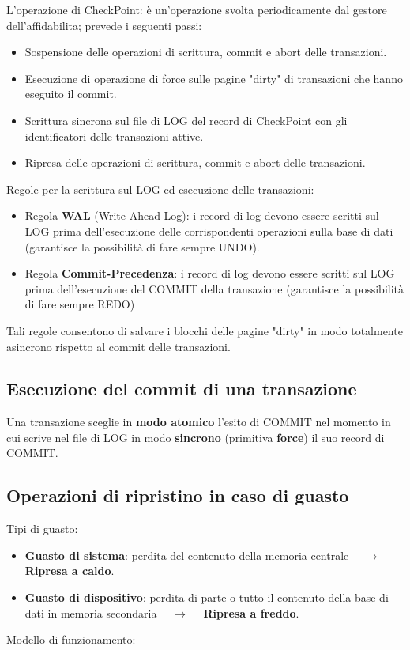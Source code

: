 \documentclass[a4paper, 10pt]{article}
\theoremstyle{definition}
\begin{document}
	L'operazione di CheckPoint: è un'operazione svolta
	periodicamente dal gestore dell'affidabilita; prevede i
	seguenti passi:
	\begin{itemize}
		\item Sospensione delle operazioni di scrittura, commit e abort delle
		transazioni.
		\item Esecuzione di operazione di force sulle pagine "dirty" di
		transazioni che hanno eseguito il commit.
		\item Scrittura sincrona sul file di LOG del record di CheckPoint con
		gli identificatori delle transazioni attive.
		\item Ripresa delle operazioni di scrittura, commit e abort delle
		transazioni.
	\end{itemize}
	Regole per la scrittura sul LOG ed esecuzione delle
	transazioni:
	\begin{itemize}
		\item Regola \textbf{WAL} (Write Ahead Log): i record di log devono essere
		scritti sul LOG prima dell'esecuzione delle corrispondenti
		operazioni sulla base di dati (garantisce la possibilità di fare
		sempre UNDO).
		\item Regola \textbf{Commit-Precedenza}: i record di log devono essere
		scritti sul LOG prima dell'esecuzione del COMMIT della
		transazione (garantisce la possibilità di fare sempre REDO)
	\end{itemize}
	Tali regole consentono di salvare i blocchi delle pagine
	"dirty" in modo totalmente asincrono rispetto al
	commit delle transazioni.
	
	\subsection*{Esecuzione del commit di una transazione}
		Una transazione sceglie in \textbf{modo atomico} l'esito di COMMIT nel
		momento in cui scrive nel file di LOG in modo \textbf{sincrono} (primitiva
		\textbf{force}) il suo record di COMMIT.
	
	\subsection*{Operazioni di ripristino in caso di guasto}
	Tipi di guasto:
	\begin{itemize}
		\item \textbf{Guasto di sistema}: perdita del contenuto della
		memoria centrale $\quad \rightarrow \quad$ \textbf{Ripresa a caldo}.
		\item \textbf{Guasto di dispositivo}: perdita di parte o tutto il
		contenuto della base di dati in memoria secondaria 
		$\quad \rightarrow \quad$ \textbf{Ripresa a freddo}.
	\end{itemize}
	Modello di funzionamento:
	
\end{document}
